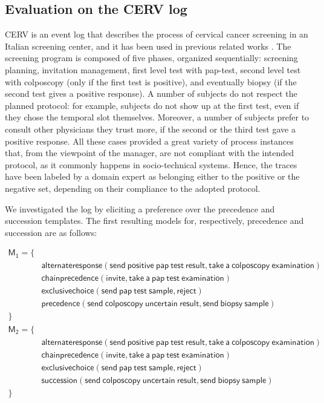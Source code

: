 \subsection{Evaluation on the CERV log}
\label{subsec:cerv}

CERV is an event log that describes the process of cervical cancer screening in an Italian screening center, and it has been used in previous related works \cite{2007b-Lamma,deviant-tkde}. The screening program is composed of five phases, organized sequentially: screening planning, invitation management, first level test with pap-test, second level test with colposcopy (only if the first test is positive), and eventually biopsy (if the second test gives a positive response). A number of subjects do not respect the planned protocol: for example, subjects do not show up at the first test, even if they chose the temporal slot themselves. Moreover, a number of subjects prefer to consult other physicians they trust more, if the second or the third test gave a positive response. All these cases provided a great variety of process instances that, from the viewpoint of the manager, are not compliant with the intended protocol, as it commonly happens in socio-technical systems.
%
Hence, the traces have been labeled by a domain expert as belonging either to the positive or the negative set, depending on their compliance to the adopted protocol.

We investigated the log by eliciting a preference over the \textsf{precedence} and \textsf{succession} templates. The first resulting models for, respectively, precedence and succession are as follows:

\begin{align*}
\mathsf{M_1} = \{ & \\
& \mathsf{ alternateresponse(send\ positive\ pap\ test\ result, take\ a\ colposcopy\ examination)} \\
& \mathsf{ chainprecedence(invite, take\ a\ pap\ test\ examination)} \\
& \mathsf{ exclusivechoice(send\ pap\ test\ sample, reject)} \\
& \mathsf{precedence(send\ colposcopy\ uncertain\ result, send\ biopsy\ sample)} \\
\} & \\
\mathsf{M_2} = \{ & \\
& \mathsf{ alternateresponse(send\ positive\ pap\ test\ result, take\ a\ colposcopy\ examination)} \\
& \mathsf{ chainprecedence(invite, take\ a\ pap\ test\ examination)} \\
& \mathsf{ exclusivechoice(send\ pap\ test\ sample, reject)} \\
& \mathsf{succession(send\ colposcopy\ uncertain\ result, send\ biopsy\ sample)} \\
\} & 
\end{align*}

